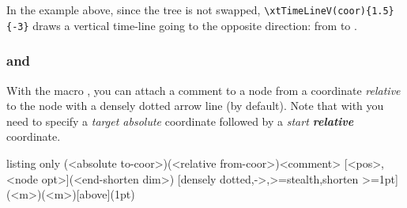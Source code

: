 In the example above, since the tree is not swapped, \verb+\xtTimeLineV(coor){1.5}{-3}+ draws a vertical time-line going to the opposite direction: from \xw{-1.5cm} to \xw{3cm}.

%


\subsubsection{\protect\cmd{\xtCommentTo} and \protect\cmd{\xtCommentFrom}}

With the macro \icmd{\xtCommentTo}, you can attach a comment to a node from a coordinate \emph{relative} to the node with a densely dotted arrow line (by default).
Note that with \cmd{\xtCommentTo} you need to specify a \emph{target absolute} coordinate followed by a \emph{start \textbf{relative}} coordinate.

\begin{tcblisting}{listing only}
  (<absolute to-coor>)(<relative from-coor>){<comment>}
              [<pos>,<node opt>](<end-shorten dim>)
  [densely dotted,->,>=stealth,shorten >=1pt](<m>)(<m>){}[above](1pt)
\end{tcblisting}

